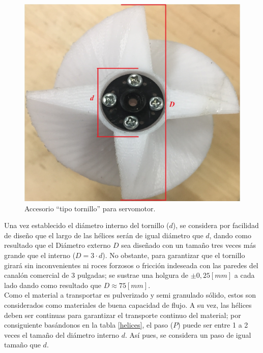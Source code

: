 \begin{enumerate}[(1)]
    \begin{figure}[H]
	\begin{center}
		\includegraphics[scale=0.13]{img/accesoriogrande.png}
	\end{center}
	\caption{Accesorio ``tipo tornillo'' para servomotor. \label{accesoriograndepng}}
    \end{figure}
    
    Una vez establecido el diámetro interno del tornillo ($d$),  se considera por facilidad de diseño que el largo de las hélices serán de igual diámetro que $d$, dando como resultado que el Diámetro externo $D$ sea diseñado con un tamaño tres veces más grande que el interno ($ D = 3\cdot d $). No obstante, para garantizar que el tornillo girará sin inconvenientes ni roces forzosos o fricción indeseada con las paredes del canalón comercial de 3 pulgadas; se sustrae una holgura de $\pm 0,25 [mm]$ a cada lado dando como resultado que $D \approx 75 [mm]$.\\
    
    Como el material a transportar es pulverizado y semi granulado sólido, estos son considerados como materiales de buena capacidad de flujo. A su vez, las hélices deben ser continuas para garantizar el transporte continuo del material; por consiguiente basándonos en la tabla \ref{helices}, el paso ($P$) puede ser entre 1 a 2 veces el tamaño del diámetro interno $d$. Así pues, se considera un paso de igual tamaño que $d$.
    

\end{enumerate}
